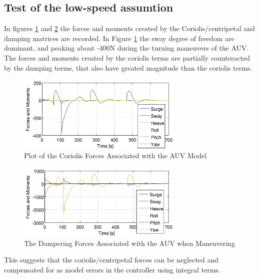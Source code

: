 	\subsection{Test of the low-speed assumtion}
		In figures \ref{fig:ch3_coriolis_forces} and \ref{fig:ch3_damping_forces} the forces and
		moments created by the Coriolis/centripetal and damping matrices are recorded. In Figure
		\ref{fig:ch3_coriolis_forces} the sway degree of freedom are dominant, and peaking about
		-400N during the turning maneuvers of the AUV. The forces and moments created by the coriolis
		terms are partially counteracted by the damping terms, that also have greated magnitude than
		the coriolis terms.
		\begin{figure}[htbp]
			\centering
			\includegraphics[width=0.7\textwidth]{pics/coriolis_forces}
			\caption{Plot of the Coriolis Forces Associated with the AUV Model}
			\label{fig:ch3_coriolis_forces}
		\end{figure}		
		\begin{figure}[htbp]
			\centering
			\includegraphics[width=0.7\textwidth]{pics/damping_forces}
			\caption{The Dampering Forces Associated with the AUV when Maneuvering}
			\label{fig:ch3_damping_forces}
		\end{figure}
		This suggests that the coriolis/centripetal forces can be neglected and compensated for as
		model errors in the controller using integral terms.  

